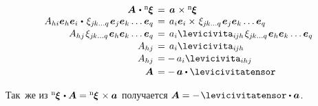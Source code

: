 \nopagebreak\vspace{-0.1em}\begin{equation*}
\begin{array}{r@{\hspace{1ex}}c@{\hspace{1ex}}l}
\bm{A} \hspace{.2ex}\dotp\hspace{.1ex} {^\mathrm{n}\hspace{-0.12ex}\bm{\xi}} & = & \bm{a} \hspace{.1ex} \times {^\mathrm{n}\hspace{-0.12ex}\bm{\xi}}
\\
%
A_{hi} \bm{e}_h \bm{e}_i \hspace{.1ex}\dotp\hspace{.25ex} \xi_{j\hspace{-0.1ex}k \ldots q} \hspace{.2ex} \bm{e}_j \bm{e}_k \ldots \bm{e}_q & = & a_{i} \bm{e}_i \times\hspace{.2ex} \xi_{j\hspace{-0.1ex}k \ldots q} \hspace{.2ex} \bm{e}_j \bm{e}_k \ldots \bm{e}_q
\\[.1em]
%
A_{hj} \hspace{.2ex} \xi_{j\hspace{-0.1ex}k \ldots q} \hspace{.2ex} \bm{e}_h \bm{e}_k \ldots \bm{e}_q & = & a_{i} \levicivita_{i\hspace{-0.1ex}jh} \hspace{.2ex} \xi_{j\hspace{-0.1ex}k \ldots q} \hspace{.2ex} \bm{e}_h \bm{e}_k \ldots \bm{e}_q
\\[.1em]
%
A_{hj} & = & a_{i} \levicivita_{i\hspace{-0.1ex}jh}
\\[.1em]
%
A_{hj} & = & \! - \, a_{i} \levicivita_{ihj}
\\[.2em]
%
\bm{A} & = & \! - \, \bm{a} \dotp \levicivitatensor
\end{array}
\end{equation*}

Так~же из ${{^\mathrm{n}\hspace{-0.12ex}\bm{\xi}} \hspace{.2ex} \dotp \bm{A} = {^\mathrm{n}\hspace{-0.12ex}\bm{\xi}} \hspace{.2ex}\times \bm{a}}$ получается ${\bm{A} = - \hspace{.2ex} \levicivitatensor \dotp \bm{a}}$.

